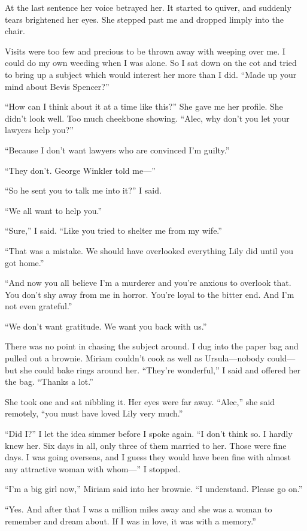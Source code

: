 \documentclass{novel}
\begin{document}
At the last sentence her voice betrayed her. It started to quiver, and suddenly tears brightened her eyes. She stepped past me and dropped limply into the chair.

Visits were too few and precious to be thrown away with weeping over me. I could do my own weeding when I was alone. So I sat down on the cot and tried to bring up a subject which would interest her more than I did. “Made up your mind about Bevis Spencer?”

“How can I think about it at a time like this?” She gave me her profile. She didn’t look well. Too much cheekbone showing. “Alec, why don’t you let your lawyers help you?”

“Because I don’t want lawyers who are convinced I’m guilty.”

“They don’t. George Winkler told me—”

“So he sent you to talk me into it?” I said.

“We all want to help you.”

“Sure,” I said. “Like you tried to shelter me from my wife.”

“That was a mistake. We should have overlooked everything Lily did until you got home.”

“And now you all believe I’m a murderer and you’re anxious to overlook that. You don’t shy away from me in horror. You’re loyal to the bitter end. And I’m not even grateful.”

“We don’t want gratitude. We want you back with us.”

There was no point in chasing the subject around. I dug into the paper bag and pulled out a brownie. Miriam couldn’t cook as well as Ursula—nobody could—but she could bake rings around her. “They’re wonderful,” I said and offered her the bag. “Thanks a lot.”

She took one and sat nibbling it. Her eyes were far away. “Alec,” she said remotely, “you must have loved Lily very much.”

“Did I?” I let the idea simmer before I spoke again. “I don’t think so. I hardly knew her. Six days in all, only three of them married to her. Those were fine days. I was going overseas, and I guess they would have been fine with almost any attractive woman with whom—” I stopped.

“I’m a big girl now,” Miriam said into her brownie. “I understand. Please go on.”

“Yes. And after that I was a million miles away and she was a woman to remember and dream about. If I was in love, it was with a memory.”
\end{document}

